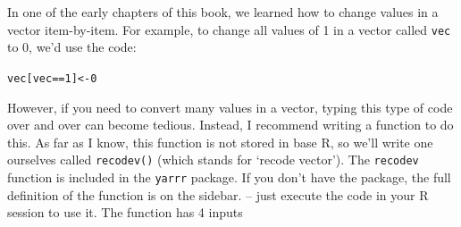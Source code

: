 \documentclass{tufte-book}\usepackage[]{graphicx}\usepackage[]{color}
\makeatletter
\newcommand{\hlnum}[1]{\textcolor[rgb]{0.686,0.059,0.569}{#1}}%
\newcommand{\hlopt}[1]{\textcolor[rgb]{0,0,0}{#1}}%
\newcommand{\hlstd}[1]{\textcolor[rgb]{0.345,0.345,0.345}{#1}}%
\newcommand{\hlkwb}[1]{\textcolor[rgb]{0.69,0.353,0.396}{#1}}%
\newenvironment{kframe}{%
 \def\at@end@of@kframe{}%
 \ifinner\ifhmode%
  \def\at@end@of@kframe{\end{minipage}}%
  \begin{minipage}{\columnwidth}%
 \fi\fi%
 \def\FrameCommand##1{\hskip\@totalleftmargin \hskip-\fboxsep
 \colorbox{shadecolor}{##1}\hskip-\fboxsep
     \hskip-\linewidth \hskip-\@totalleftmargin \hskip\columnwidth}%
 \MakeFramed {\advance\hsize-\width
   \@totalleftmargin\z@ \linewidth\hsize
   \@setminipage}}%
 {\par\unskip\endMakeFramed%
 \at@end@of@kframe}
\newenvironment{knitrout}{}{} %
\makeatother
\begin{document}
In one of the early chapters of this book, we learned how to change values in a vector item-by-item. For example, to change all values of 1 in a vector called \texttt{vec} to 0, we'd use the code:

\begin{knitrout}
\color{fgcolor}\begin{kframe}
\begin{alltt}
\hlstd{vec[vec} \hlopt{==} \hlnum{1}\hlstd{]} \hlkwb{<-} \hlnum{0}
\end{alltt}
\end{kframe}
\end{knitrout}

However, if you need to convert many values in a vector, typing this type of code over and over can become tedious. Instead, I recommend writing a function to do this. As far as I know, this function is not stored in base R, so we'll write one ourselves called \texttt{recodev()} (which stands for `recode vector'). The \texttt{recodev} function is included in the \texttt{yarrr} package. If you don't have the package, the full definition of the function is on the sidebar. -- just execute the code in your R session to use it.
The function has 4 inputs
\end{document}
